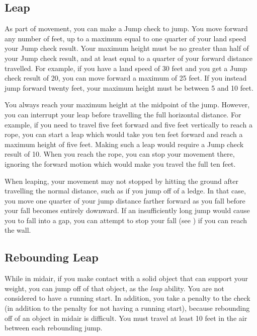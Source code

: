     \subsection{Leap}\label{Leap}
        As part of movement, you can make a Jump check to jump.
        You move forward any number of feet, up to a maximum equal to one quarter of your land speed \add your Jump check result.
        Your maximum height must be no greater than half of your Jump check result, and at least equal to a quarter of your forward distance travelled.
        For example, if you have a land speed of 30 feet and you get a Jump check result of 20, you can move forward a maximum of 25 feet.
        If you instead jump forward twenty feet, your maximum height must be between 5 and 10 feet.

        You always reach your maximum height at the midpoint of the jump.
        However, you can interrupt your leap before travelling the full horizontal distance.
        For example, if you need to travel five feet forward and five feet vertically to reach a rope, you can start a leap which would take you ten feet forward and reach a maximum height of five feet.
        Making such a leap would require a Jump check result of 10.
        When you reach the rope, you can stop your movement there, ignoring the forward motion which would make you travel the full ten feet.

        When leaping, your movement may not stopped by hitting the ground after travelling the normal distance, such as if you jump off of a ledge.
        In that case, you move one quarter of your jump distance farther forward as you fall before your fall becomes entirely downward.
        If an insufficiently long jump would cause you to fall into a gap, you can attempt to stop your fall (see ) if you can reach the wall.

    \subsection{Rebounding Leap}\label{Rebounding Leap}
        While in midair, if you make contact with a solid object that can support your weight, you can jump off of that object, as the \textit{leap} ability.
        You are not considered to have a running start.
        In addition, you take a  penalty to the check (in addition to the penalty for not having a running start), because rebounding off of an object in midair is difficult.
        You must travel at least 10 feet in the air between each rebounding jump.

